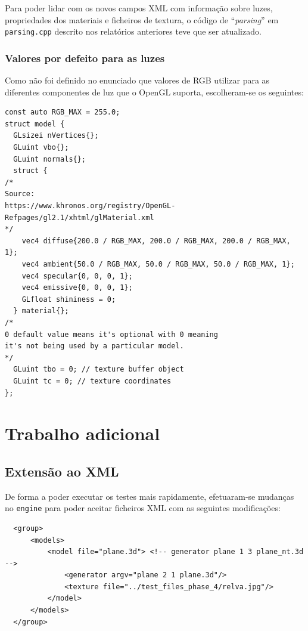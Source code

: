 \documentclass[11pt,a4paper]{report}%
\begin{document}
Para poder lidar com os novos campos XML com informação sobre luzes, propriedades dos
materiais e ficheiros de textura, o código de ``\textit{parsing}'' em \texttt{parsing.cpp}
descrito nos relatórios anteriores teve que ser atualizado.

\subsection{Valores por defeito para as luzes}

Como não foi definido no enunciado que valores de RGB utilizar para as diferentes componentes
de luz que o OpenGL suporta, escolheram-se os seguintes:

\begin{lstlisting}
const auto RGB_MAX = 255.0;
struct model {
  GLsizei nVertices{};
  GLuint vbo{};
  GLuint normals{};
  struct {
/*
Source:
https://www.khronos.org/registry/OpenGL-Refpages/gl2.1/xhtml/glMaterial.xml
*/
    vec4 diffuse{200.0 / RGB_MAX, 200.0 / RGB_MAX, 200.0 / RGB_MAX, 1};
    vec4 ambient{50.0 / RGB_MAX, 50.0 / RGB_MAX, 50.0 / RGB_MAX, 1};
    vec4 specular{0, 0, 0, 1};
    vec4 emissive{0, 0, 0, 1};
    GLfloat shininess = 0;
  } material{};
/*
0 default value means it's optional with 0 meaning
it's not being used by a particular model.
*/
  GLuint tbo = 0; // texture buffer object
  GLuint tc = 0; // texture coordinates
};
\end{lstlisting}


\chapter{Trabalho adicional} \label{chap:plus} %

\section{Extensão ao XML}

De forma a poder executar os testes mais rapidamente, efetuaram-se mudanças no \texttt{engine}
para poder aceitar ficheiros XML com as seguintes modificações:

\begin{lstlisting}
  <group>
      <models>
          <model file="plane.3d"> <!-- generator plane 1 3 plane_nt.3d -->
              <generator argv="plane 2 1 plane.3d"/>
              <texture file="../test_files_phase_4/relva.jpg"/>
          </model>
      </models>
  </group>
\end{lstlisting}
\end{document}
